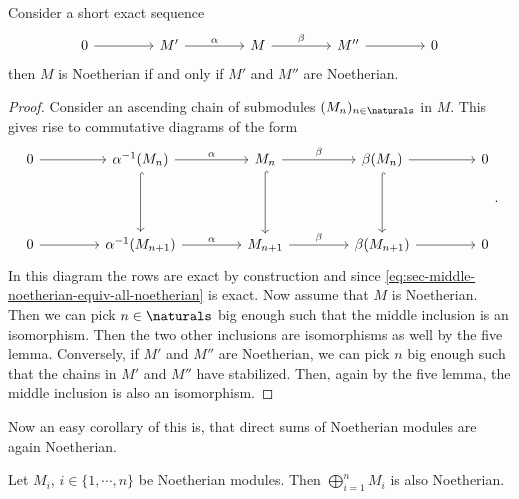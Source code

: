 \begin{proposition}
  \label{prop:middle-in-sec-noetherian-equiv-all-noetherian}
  Consider a short exact sequence
  \begin{equation}
    \label{eq:sec-middle-noetherian-equiv-all-noetherian}
    \begin{tikzcd}[nodes in empty cells, column sep= 1.5cm, row sep= 1.5cm]
      0 \ar[r] & M' \ar[r,"\alpha"] & M \ar[r, "\beta"] & M'' \ar[r] & 0
    \end{tikzcd}
  \end{equation}
  then $M$ is Noetherian if and only if $M'$ and $M''$ are Noetherian.
\end{proposition}

\begin{proof}
  Consider an ascending chain of submodules $(M_n)_{n\in \naturals}$
  in $M$. This gives rise to commutative diagrams of the form
  \begin{equation}
    \label{eq:diagram-for-five-lemma-proof-of-sec-of-noetherian-modules}
    \begin{tikzcd}[nodes in empty cells, column sep= 1.5cm, row sep=1.5cm]
      0 \ar[r]
      & \alpha^{-1}(M_n) \ar[r,"\alpha"] \ar[d, hook]
      & M_n \ar[r, "\beta"] \ar[d, hook]
      & \beta(M_n) \ar[r] \ar[d, hook]
      & 0
      \\
      0 \ar[r] 
      & \alpha^{-1}(M_{n+1}) \ar[r,"\alpha"]
      & M_{n+1} \ar[r, "\beta"]
      & \beta(M_{n+1}) \ar[r]
      & 0
    \end{tikzcd}.
  \end{equation}
  In this diagram the rows are exact by construction and since
  \eqref{eq:sec-middle-noetherian-equiv-all-noetherian} is exact.
  Now assume that $M$ is Noetherian. Then we can pick $n\in \naturals$
  big enough such that the middle inclusion is an isomorphism. Then
  the two other inclusions are isomorphisms as well by the five
  lemma. Conversely, if $M'$ and $M''$ are Noetherian, we can pick $n$
  big enough such that the chains in $M'$ and $M''$ have
  stabilized. Then, again by the five lemma, the middle inclusion is
  also an isomorphism.
\end{proof}

Now an easy corollary of this is, that direct sums of Noetherian
modules are again Noetherian.

\begin{corollary}
  \label{cor:direct-sum-of-noetherian-is-noetherian}
  Let $M_i$, $i\in \{1,\cdots, n\}$ be Noetherian modules. Then
  $\bigoplus_{i=1}^n M_i$ is also Noetherian.
\end{corollary}

